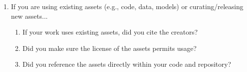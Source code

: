 \documentclass{article}
\begin{document}
\begin{enumerate}
\item If you are using existing assets (e.g., code, data, models) or curating/releasing new assets...
\begin{enumerate}
  \item If your work uses existing assets, did you cite the creators?
    \answerYes{}
  \item Did you make sure the license of the assets permits usage?
    \answerYes{}
  \item Did you reference the assets directly within your code and repository?
    \answerYes{}
\end{enumerate}
\end{enumerate}
\end{document}
